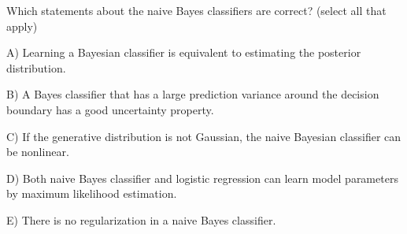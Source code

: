 Which statements about the naive Bayes classifiers are correct? (select all that apply)


A) Learning a Bayesian classifier is equivalent to estimating the posterior distribution.


B) A Bayes classifier that has a large prediction variance around the decision boundary has a good uncertainty property.


C) If the generative distribution is not Gaussian, the naive Bayesian classifier can be nonlinear.


D) Both naive Bayes classifier and logistic regression can learn model parameters by maximum likelihood estimation.


E) There is no regularization in a naive Bayes classifier.
